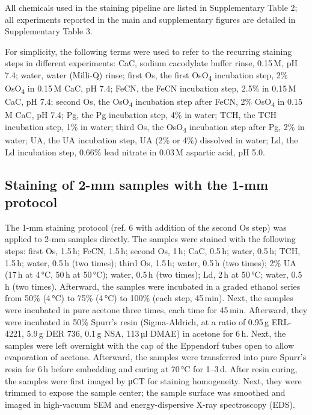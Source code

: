 \documentclass{article}
\begin{document}
All chemicals used in the staining pipeline are listed in Supplementary Table 2; all experiments reported in the main and supplementary figures are detailed in Supplementary Table 3.

For simplicity, the following terms were used to refer to the recurring staining steps in different experiments: CaC, sodium cacodylate buffer rinse, 0.15\,M, pH 7.4; water, water (Milli-Q) rinse; first Os, the first OsO\textsubscript{4} incubation step, 2\% OsO\textsubscript{4} in 0.15\,M CaC, pH 7.4; FeCN, the FeCN incubation step, 2.5\% in 0.15\,M CaC, pH 7.4; second Os, the OsO\textsubscript{4} incubation step after FeCN, 2\% OsO\textsubscript{4} in 0.15\,M CaC, pH 7.4; Pg, the Pg incubation step, 4\% in water; TCH, the TCH incubation step, 1\% in water; third Os, the OsO\textsubscript{4} incubation step after Pg, 2\% in water; UA, the UA incubation step, UA (2\% or 4\%) dissolved in water; Ld, the Ld incubation step, 0.66\% lead nitrate in 0.03\,M aspartic acid, pH 5.0.

\subsection*{Staining of 2-mm samples with the 1-mm protocol}
The 1-mm staining protocol (ref. 6 with addition of the second Os step) was applied to 2-mm samples directly. The samples were stained with the following steps: first Os, 1.5\,h; FeCN, 1.5\,h; second Os, 1\,h; CaC, 0.5\,h; water, 0.5\,h; TCH, 1.5\,h; water, 0.5\,h (two times); third Os, 1.5\,h; water, 0.5\,h (two times); 2\% UA (17\,h at 4\,°C, 50\,h at 50\,°C); water, 0.5\,h (two times); Ld, 2\,h at 50\,°C; water, 0.5\,h (two times). Afterward, the samples were incubated in a graded ethanol series from 50\% (4\,°C) to 75\% (4\,°C) to 100\% (each step, 45\,min). Next, the samples were incubated in pure acetone three times, each time for 45\,min. Afterward, they were incubated in 50\% Spurr’s resin (Sigma-Aldrich, at a ratio of 0.95\,g ERL-4221, 5.9\,g DER 736, 0.1\,g NSA, 113\,µl DMAE) in acetone for 6\,h. Next, the samples were left overnight with the cap of the Eppendorf tubes open to allow evaporation of acetone. Afterward, the samples were transferred into pure Spurr’s resin for 6\,h before embedding and curing at 70\,°C for 1–3\,d. After resin curing, the samples were first imaged by μCT for staining homogeneity. Next, they were trimmed to expose the sample center; the sample surface was smoothed and imaged in high-vacuum SEM and energy-dispersive X-ray spectroscopy (EDS).
\end{document}
